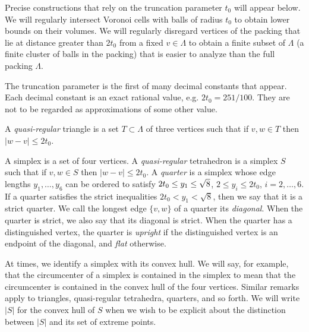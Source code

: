 Precise constructions that rely on the truncation parameter $t_0$
will appear below.  We will regularly intersect Voronoi cells with
balls of radius $t_0$ to obtain lower bounds on their volumes.  We
will regularly disregard vertices of the packing that lie at
distance greater than $2t_0$ from a fixed $v\in\Lambda$ to obtain
a finite subset of $\Lambda$ (a finite cluster of balls in the
packing) that is easier to analyze than the full packing
$\Lambda$.

The truncation parameter is the first of many decimal constants
that appear. Each decimal constant is an exact rational value,
e.g. $2t_0 = 251/100$.  They are not to be regarded as
approximations of some other value.

\begin{definition}
A {\it quasi-regular\/} triangle is
a set $T\subset \Lambda$ of three vertices such that if $v,w\in T$
then $|w-v|\le2t_0$. \end{definition}

\begin{definition}
A  simplex is a set of four
vertices.
A {\it quasi-regular\/} tetrahedron is a simplex $S$ such that if
$v,w\in S$ then $|w-v|\le 2t_0$. A {\it quarter\/} is a simplex
whose edge lengths $y_1,\ldots,y_6$ can be ordered to satisfy
$2t_0\le y_1\le\sqrt8$, $2\le y_i\le 2t_0$, $i=2,\ldots,6$. If a
quarter satisfies the strict inequalities $2t_0< y_1< \sqrt8$,
then we say that it is a strict quarter. We call the longest edge
$\{v,w\}$ of a quarter its {\it {} diagonal\/}. When
the quarter is strict, we also say that its diagonal is strict.
When the quarter has a distinguished vertex, the quarter is {\it
upright\/} if the distinguished vertex is an endpoint of the
diagonal, and {\it flat\/} otherwise.
\end{definition}
 
 
 

At times, we identify a simplex with its convex hull. We will say,
for example, that the circumcenter of a simplex is contained in
the simplex to mean that the circumcenter is contained in the
convex hull of the four vertices.  Similar remarks apply to
triangles, quasi-regular tetrahedra, quarters, and so forth.  We
will write $|S|$ for the convex hull of $S$ when we wish to be
explicit about the distinction between $|S|$ and its set of
extreme points.

